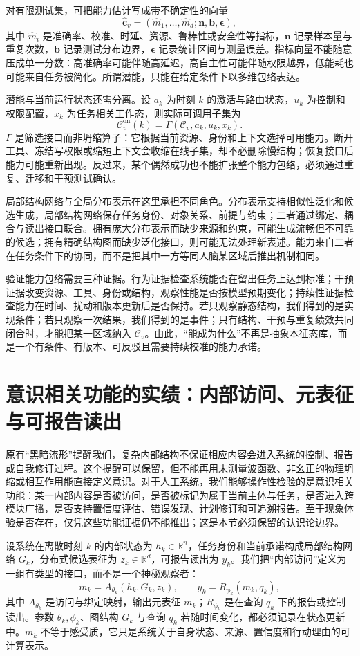 对有限测试集，可把能力估计写成带不确定性的向量
\[
\widehat{\mathbf c}_v=
(\widehat m_1,\ldots,\widehat m_d;
\mathbf n,\mathbf b,\boldsymbol\epsilon),
\]
其中 $\widehat m_i$ 是准确率、校准、时延、资源、鲁棒性或安全性等指标，$\mathbf n$ 记录样本量与重复次数，$\mathbf b$ 记录测试分布边界，$\boldsymbol\epsilon$ 记录统计区间与测量误差。指标向量不能随意压成单一分数：高准确率可能伴随高延迟，高自主性可能伴随权限越界，低能耗也可能来自任务被简化。所谓潜能，只能在给定条件下以多维包络表达。

潜能与当前运行状态还需分离。设 $a_k$ 为时刻 $k$ 的激活与路由状态，$u_k$ 为控制和权限配置，$x_k$ 为任务相关工作态，则实际可调用子集为
\[
\mathcal C_v^{\mathrm{on}}(k)
=\Gamma(\mathcal C_v,a_k,u_k,x_k).
\]
$\Gamma$ 是筛选接口而非坍缩算子：它根据当前资源、身份和上下文选择可用能力。断开工具、冻结写权限或缩短上下文会收缩在线子集，却不必删除慢结构；恢复接口后能力可能重新出现。反过来，某个偶然成功也不能扩张整个能力包络，必须通过重复、迁移和干预测试确认。

局部结构网络与全局分布表示在这里承担不同角色。分布表示支持相似性泛化和候选生成，局部结构网络保存任务身份、对象关系、前提与约束；二者通过绑定、耦合与读出接口联合。拥有庞大分布表示而缺少来源和约束，可能生成流畅但不可靠的候选；拥有精确结构图而缺少泛化接口，则可能无法处理新表述。能力来自二者在任务条件下的协同，而不是把其中一方等同人脑某区域后推出机制相同。

验证能力包络需要三种证据。行为证据检查系统能否在留出任务上达到标准；干预证据改变资源、工具、身份或结构，观察性能是否按模型预期变化；持续性证据检查能力在时间、扰动和版本更新后是否保持。若只观察静态结构，我们得到的是实现条件；若只观察一次结果，我们得到的是事件；只有结构、干预与重复绩效共同闭合时，才能把某一区域纳入 $\mathcal C_v$。由此，“能成为什么”不再是抽象本征态库，而是一个有条件、有版本、可反驳且需要持续校准的能力承诺。

\section{意识相关功能的实绩：内部访问、元表征与可报告读出}
\label{sec:section_6452}
原有“黑暗流形”提醒我们，复杂内部结构不保证相应内容会进入系统的控制、报告或自我修订过程。这个提醒可以保留，但不能再用未测量波函数、非幺正的物理坍缩或相互作用能直接定义意识。对于人工系统，我们能够操作性检验的是意识相关功能：某一内部内容是否被访问，是否被标记为属于当前主体与任务，是否进入跨模块广播，是否支持置信度评估、错误发现、计划修订和可追溯报告。至于现象体验是否存在，仅凭这些功能证据仍不能推出；这是本节必须保留的认识论边界。

设系统在离散时刻 $k$ 的内部状态为 $h_k\in\mathbb R^n$，任务身份和当前承诺构成局部结构网络 $G_k$，分布式候选表征为 $z_k\in\mathbb R^d$，可报告读出为 $y_k$。我们把“内部访问”定义为一组有类型的接口，而不是一个神秘观察者：
\[
m_k=A_{\theta_k}(h_k,G_k,z_k),\qquad
y_k=R_{\phi_k}(m_k,q_k),
\]
其中 $A_{\theta_k}$ 是访问与绑定映射，输出元表征 $m_k$；$R_{\phi_k}$ 是在查询 $q_k$ 下的报告或控制读出。参数 $\theta_k,\phi_k$、图结构 $G_k$ 与查询 $q_k$ 若随时间变化，都必须记录在状态更新中。$m_k$ 不等于感受质，它只是系统关于自身状态、来源、置信度和行动理由的可计算表示。

